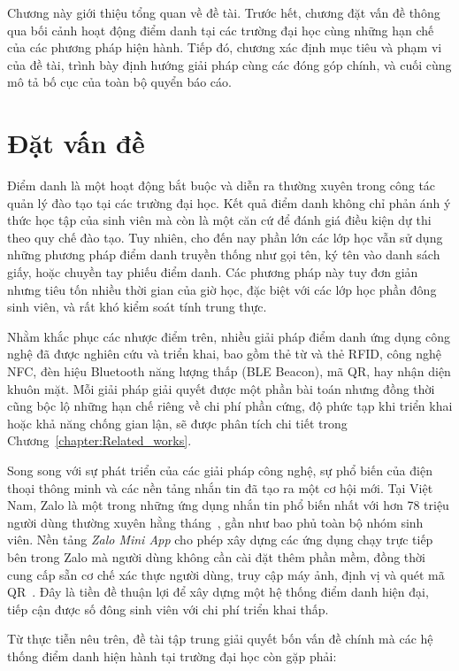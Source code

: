 \documentclass[../main.tex]{subfiles}
\begin{document}
Chương này giới thiệu tổng quan về đề tài. Trước hết, chương đặt vấn đề thông qua bối cảnh
hoạt động điểm danh tại các trường đại học cùng những hạn chế của các phương pháp hiện hành.
Tiếp đó, chương xác định mục tiêu và phạm vi của đề tài, trình bày định hướng giải pháp cùng
các đóng góp chính, và cuối cùng mô tả bố cục của toàn bộ quyển báo cáo.

\section{Đặt vấn đề}
\label{sec:dat-van-de}

Điểm danh là một hoạt động bắt buộc và diễn ra thường xuyên trong công tác quản lý đào
tạo tại các trường đại học. Kết quả điểm danh không chỉ phản ánh ý thức học tập của
sinh viên mà còn là một căn cứ để đánh giá điều kiện dự thi theo quy chế đào tạo. Tuy
nhiên, cho đến nay phần lớn các lớp học vẫn sử dụng những phương pháp điểm danh truyền
thống như gọi tên, ký tên vào danh sách giấy, hoặc chuyền tay phiếu điểm danh. Các
phương pháp này tuy đơn giản nhưng tiêu tốn nhiều thời gian của giờ học, đặc biệt với
các lớp học phần đông sinh viên, và rất khó kiểm soát tính trung thực.

Nhằm khắc phục các nhược điểm trên, nhiều giải pháp điểm danh ứng dụng công nghệ đã
được nghiên cứu và triển khai, bao gồm thẻ từ và thẻ RFID, công nghệ NFC, đèn hiệu
Bluetooth năng lượng thấp (BLE Beacon), mã QR, hay nhận diện khuôn mặt. Mỗi giải pháp
giải quyết được một phần bài toán nhưng đồng thời cũng bộc lộ những hạn chế riêng về
chi phí phần cứng, độ phức tạp khi triển khai hoặc khả năng chống gian lận, sẽ được
phân tích chi tiết trong Chương~\ref{chapter:Related_works}.

Song song với sự phát triển của các giải pháp công nghệ, sự phổ biến của điện thoại
thông minh và các nền tảng nhắn tin đã tạo ra một cơ hội mới. Tại Việt Nam, Zalo là một
trong những ứng dụng nhắn tin phổ biến nhất với hơn 78 triệu người dùng thường xuyên hằng
tháng~\cite{zalostats}, gần như bao phủ toàn bộ nhóm sinh viên. Nền tảng \textit{Zalo Mini App} cho
phép xây dựng các ứng dụng chạy trực tiếp bên trong Zalo mà người dùng không cần cài
đặt thêm phần mềm, đồng thời cung cấp sẵn cơ chế xác thực người dùng, truy cập máy ảnh,
định vị và quét mã QR~\cite{zalominiapp}. Đây là tiền đề thuận lợi để xây dựng một hệ
thống điểm danh hiện đại, tiếp cận được số đông sinh viên với chi phí triển khai thấp.

Từ thực tiễn nêu trên, đề tài tập trung giải quyết bốn vấn đề chính mà các hệ thống
điểm danh hiện hành tại trường đại học còn gặp phải:
\end{document}
